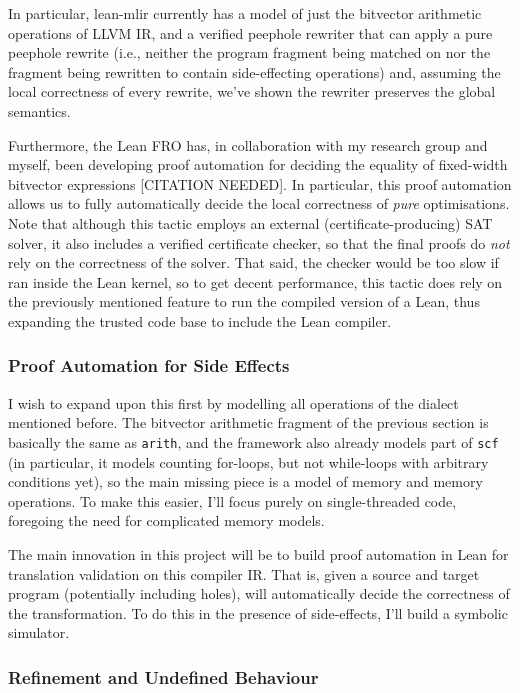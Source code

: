 In particular, lean-mlir currently has a model of just the bitvector
arithmetic operations of LLVM IR, and a verified peephole rewriter that
can apply a pure peephole rewrite (i.e., neither the program fragment
being matched on nor the fragment being rewritten to contain
side-effecting operations) and, assuming the local correctness of every
rewrite, we've shown the rewriter preserves the global semantics.

Furthermore, the Lean FRO has, in collaboration with my research group
and myself, been developing proof automation for deciding the equality
of fixed-width bitvector expressions {[}CITATION NEEDED{]}. In
particular, this proof automation allows us to fully automatically
decide the local correctness of \emph{pure} optimisations. Note that
although this tactic employs an external (certificate-producing) SAT
solver, it also includes a verified certificate checker, so that the
final proofs do \emph{not} rely on the correctness of the solver. That
said, the checker would be too slow if ran inside the Lean kernel, so to
get decent performance, this tactic does rely on the previously
mentioned feature to run the compiled version of a Lean, thus expanding
the trusted code base to include the Lean compiler.

\subsubsection{Proof Automation for Side
Effects}\label{proof-automation-for-side-effects}

I wish to expand upon this first by modelling all operations of the
dialect mentioned before. The bitvector arithmetic fragment of the
previous section is basically the same as \texttt{arith}, and the
framework also already models part of \texttt{scf} (in particular, it
models counting for-loops, but not while-loops with arbitrary conditions
yet), so the main missing piece is a model of memory and memory
operations. To make this easier, I'll focus purely on single-threaded
code, foregoing the need for complicated memory models.

The main innovation in this project will be to build proof automation in
Lean for translation validation on this compiler IR. That is, given a
source and target program (potentially including holes), will
automatically decide the correctness of the transformation. To do this
in the presence of side-effects, I'll build a symbolic simulator.

\subsubsection{Refinement and Undefined
Behaviour}\label{refinement-and-undefined-behaviour}

